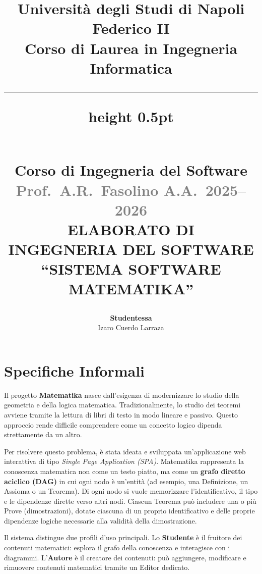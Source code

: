 \documentclass[12pt,a4paper]{article}
\title{
\begin{center}
\textcolor{PrimaryBlue}{\small\textbf{Università degli Studi di Napoli Federico II}}\\[0.2cm]
\textcolor{PrimaryBlue}{Corso di Laurea in Ingegneria Informatica}\\[0.5cm]
{\color{PrimaryOrange}\hrule height 0.5pt}\\[0.5cm]
\textcolor{PrimaryOrange}{Corso di Ingegneria del Software}\\[0.2cm]
\textcolor{gray}{Prof.~A.R.~Fasolino \hspace{0.5cm} A.A.~2025--2026}\\[2cm]
{\Huge\bfseries\textcolor{PrimaryBlue}{ELABORATO DI}\\[0.1cm] \textcolor{PrimaryBlue}{INGEGNERIA DEL SOFTWARE}}\\[1cm]
{\LARGE\textcolor{PrimaryOrange}{\textquotedblleft SISTEMA SOFTWARE MATEMATIKA\textquotedblright}}\\[2.5cm]
\end{center}
}
\author{\Large\textbf{Studentessa}\\[0.2cm] \Large Izaro Cuerdo Larraza}
\date{}
\begin{document}
\maketitle
\thispagestyle{empty}
\newpage

\tableofcontents
\newpage
\newpage

\section{Specifiche Informali}
Il progetto \textbf{Matematika} nasce dall'esigenza di modernizzare lo studio della geometria e della logica matematica. Tradizionalmente, lo studio dei teoremi avviene tramite la lettura di libri di testo in modo lineare e passivo. Questo approccio rende difficile comprendere come un concetto logico dipenda strettamente da un altro.

Per risolvere questo problema, è stata ideata e sviluppata un'applicazione web interattiva di tipo \textit{Single Page Application (SPA)}. Matematika rappresenta la conoscenza matematica non come un testo piatto, ma come un \textbf{grafo diretto aciclico (DAG)} in cui ogni nodo è un'entità (ad esempio, una Definizione, un Assioma o un Teorema). Di ogni nodo si vuole memorizzare l'identificativo, il tipo e le dipendenze dirette verso altri nodi. Ciascun Teorema può includere una o più Prove (dimostrazioni), dotate ciascuna di un proprio identificativo e delle proprie dipendenze logiche necessarie alla validità della dimostrazione.

Il sistema distingue due profili d'uso principali. Lo \textbf{Studente} è il fruitore dei contenuti matematici: esplora il grafo della conoscenza e interagisce con i diagrammi. L'\textbf{Autore} è il creatore dei contenuti: può aggiungere, modificare e rimuovere contenuti matematici tramite un Editor dedicato.
\end{document}
